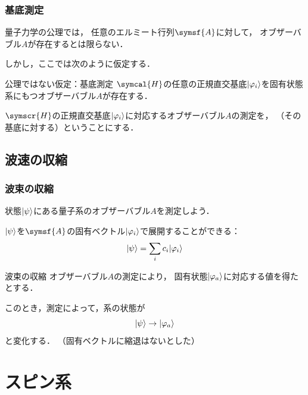 \documentclass[
    10pt,
    ]{sotsu-beamer}
\begin{document}
\begin{frame}
    \frametitle{基底測定}

    量子力学の公理では，
    任意のエルミート行列$\symsf{A}$に対して，
    オブザーバブル$A$が存在するとは限らない．

    しかし，ここでは次のように仮定する．

    \begin{block}{公理ではない仮定：基底測定}
        $\symcal{H}$の任意の正規直交基底$\ket{\varphi_i}$を固有状態系にもつオブザーバブル$A$が存在する．
    \end{block}

    $\symscr{H}$の正規直交基底$\ket{\varphi_i}$に対応するオブザーバブル$A$の測定を，
    （その基底に対する）ということにする．

\end{frame}


\subsection{波速の収縮}


\begin{frame}
    \frametitle{波束の収縮}

    状態$\ket{\psi}$にある量子系のオブザーバブル$A$を測定しよう．
    
    $\ket{\psi}$を$\symsf{A}$の固有ベクトル$\ket{\varphi_i}$で展開することができる：
    \begin{equation*}
        \ket{\psi} = \sum_i c_i \ket{\varphi_i}
    \end{equation*}

    \begin{block}{波束の収縮}
        オブザーバブル$A$の測定により，
        固有状態$\ket{\varphi_a}$に対応する値を得たとする．
    
        このとき，測定によって，系の状態が
        \begin{equation*}
            \ket{\psi} \to \ket{\varphi_a}
        \end{equation*}
        と変化する．
        （固有ベクトルに縮退はないとした）
    \end{block}

\end{frame}


\section{スピン系}
\end{document}
